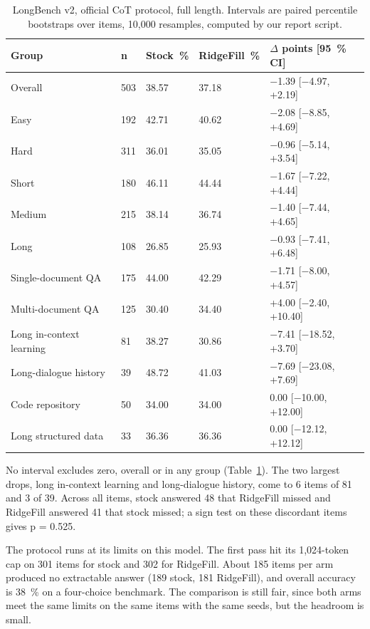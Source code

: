 \documentclass[11pt]{article}
\begin{document}
\begin{table}[!htbp]
\centering
\caption{LongBench v2, official CoT protocol, full length. Intervals are paired percentile bootstraps over items, 10,000 resamples, computed by our report script.}\label{tab:11}
\small
\setlength{\tabcolsep}{4pt}
\begin{tabular}{lllll}
\toprule
Group & n & Stock~\% & RidgeFill~\% & $\Delta$ points [95~\% CI] \\
\midrule
Overall & 503 & 38.57 & 37.18 & $-$1.39 [$-$4.97, +2.19] \\
Easy & 192 & 42.71 & 40.62 & $-$2.08 [$-$8.85, +4.69] \\
Hard & 311 & 36.01 & 35.05 & $-$0.96 [$-$5.14, +3.54] \\
Short & 180 & 46.11 & 44.44 & $-$1.67 [$-$7.22, +4.44] \\
Medium & 215 & 38.14 & 36.74 & $-$1.40 [$-$7.44, +4.65] \\
Long & 108 & 26.85 & 25.93 & $-$0.93 [$-$7.41, +6.48] \\
Single-document QA & 175 & 44.00 & 42.29 & $-$1.71 [$-$8.00, +4.57] \\
Multi-document QA & 125 & 30.40 & 34.40 & +4.00 [$-$2.40, +10.40] \\
Long in-context learning & 81 & 38.27 & 30.86 & $-$7.41 [$-$18.52, +3.70] \\
Long-dialogue history & 39 & 48.72 & 41.03 & $-$7.69 [$-$23.08, +7.69] \\
Code repository & 50 & 34.00 & 34.00 & 0.00 [$-$10.00, +12.00] \\
Long structured data & 33 & 36.36 & 36.36 & 0.00 [$-$12.12, +12.12] \\
\bottomrule
\end{tabular}
\end{table}

No interval excludes zero, overall or in any group (Table~\ref{tab:11}). The two largest drops, long in-context learning and long-dialogue history, come to 6 items of 81 and 3 of 39. Across all items, stock answered 48 that RidgeFill missed and RidgeFill answered 41 that stock missed; a sign test on these discordant items gives p = 0.525.

The protocol runs at its limits on this model. The first pass hit its 1,024-token cap on 301 items for stock and 302 for RidgeFill. About 185 items per arm produced no extractable answer (189 stock, 181 RidgeFill), and overall accuracy is 38~\% on a four-choice benchmark. The comparison is still fair, since both arms meet the same limits on the same items with the same seeds, but the headroom is small.
\end{document}
